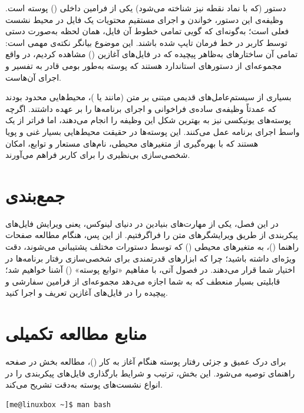 دستور  (که با نماد نقطه  نیز شناخته می‌شود) یکی از فرامین داخلی () پوسته است. وظیفه‌ی این دستور، خواندن و اجرای مستقیم محتویات یک فایل در محیط نشست فعلی است؛ به‌گونه‌ای که گویی تمامی خطوط آن فایل، همان لحظه به‌صورت دستی توسط کاربر در خط فرمان تایپ شده باشند. این موضوع بیانگر نکته‌ی مهمی است: تمامی آن ساختارهای به‌ظاهر پیچیده که در فایل‌های آغازین () مشاهده کردیم، در واقع مجموعه‌ای از دستورهای استاندارد هستند که پوسته به‌طور بومی قادر به تفسیر و اجرای آن‌هاست.

بسیاری از سیستم‌عامل‌های قدیمی مبتنی بر متن (مانند  یا )، محیط‌هایی محدود بودند که عمدتاً وظیفه‌ی ساده‌ی فراخوانی و اجرای برنامه‌ها را بر عهده داشتند. اگرچه پوسته‌های یونیکسی نیز به بهترین شکل این وظیفه را انجام می‌دهند، اما فراتر از یک واسط اجرای برنامه عمل می‌کنند. این پوسته‌ها در حقیقت محیط‌هایی بسیار غنی و پویا هستند که با بهره‌گیری از متغیرهای محیطی، نام‌های مستعار و توابع، امکان شخصی‌سازی بی‌نظیری را برای کاربر فراهم می‌آورند.

\section{جمع‌بندی}

در این فصل، یکی از مهارت‌های بنیادین در دنیای لینوکس، یعنی ویرایش فایل‌های پیکربندی از طریق ویرایشگرهای متن را فراگرفتیم. از این پس، هنگام مطالعه صفحات راهنما ()، به متغیرهای محیطی () که توسط دستورات مختلف پشتیبانی می‌شوند، دقت ویژه‌ای داشته باشید؛ چرا که ابزارهای قدرتمندی برای شخصی‌سازی رفتار برنامه‌ها در اختیار شما قرار می‌دهند. در فصول آتی، با مفاهیم «توابع پوسته» () آشنا خواهیم شد؛ قابلیتی بسیار منعطف که به شما اجازه می‌دهد مجموعه‌ای از فرامین سفارشی و پیچیده را در فایل‌های آغازین  تعریف و اجرا کنید.

\section{منابع مطالعه تکمیلی}

برای درک عمیق و جزئی رفتار پوسته هنگام آغاز به کار ()، مطالعه بخش  در صفحه راهنمای  توصیه می‌شود. این بخش، ترتیب و شرایط بارگذاری فایل‌های پیکربندی را در انواع نشست‌های پوسته به‌دقت تشریح می‌کند.

\begin{latin}
\begin{lstlisting}
[me@linuxbox ~]$ man bash
\end{lstlisting}
\end{latin}